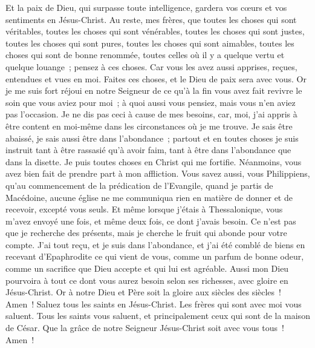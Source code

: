 \begin{multicols}{2}
Et la paix de Dieu, qui surpasse toute intelligence, gardera vos cœurs et vos sentiments en Jésus-Christ.
 Au reste, mes frères, que toutes les choses qui sont véritables, toutes les choses qui sont vénérables, toutes les choses qui sont justes, toutes les choses qui sont pures, toutes les choses qui sont aimables, toutes les choses qui sont de bonne renommée, toutes celles où il y a quelque vertu et quelque louange~; pensez à ces choses.
Car vous les avez aussi apprises, reçues, entendues et vues en moi. Faites ces choses, et le Dieu de paix sera avec vous. 
Or je me suis fort réjoui en notre Seigneur de ce qu'à la fin vous avez fait revivre le soin que vous aviez pour moi~; à quoi aussi vous pensiez, mais vous n'en aviez pas l'occasion. 
Je ne dis pas ceci à cause de mes besoins, car, moi, j'ai appris à être content en moi-même dans les circonstances où je me trouve.
Je sais être abaissé, je sais aussi être dans l'abondance~; partout et en toutes choses je suis instruit tant à être rassasié qu'à avoir faim, tant à être dans l'abondance que dans la disette.
Je puis toutes choses en Christ qui me fortifie.
Néanmoins, vous avez bien fait de prendre part à mon affliction.
Vous savez aussi, vous Philippiens, qu'au commencement de la prédication de l'Evangile, quand je partis de Macédoine, aucune église ne me communiqua rien en matière de donner et de recevoir, excepté vous seuls. 
Et même lorsque j'étais à Thessalonique, vous m'avez envoyé une fois, et même deux fois, ce dont j'avais besoin. 
Ce n'est pas que je recherche des présents, mais je cherche le fruit qui abonde pour votre compte.
J'ai tout reçu, et je suis dans l'abondance, et j'ai été comblé de biens en recevant d'Epaphrodite ce qui vient de vous, comme un parfum de bonne odeur, comme un sacrifice que Dieu accepte et qui lui est agréable.
Aussi mon Dieu pourvoira à tout ce dont vous aurez besoin selon ses richesses, avec gloire en Jésus-Christ. 
Or à notre Dieu et Père soit la gloire aux siècles des siècles~! Amen~!
Saluez tous les saints en Jésus-Christ. Les frères qui sont avec moi vous saluent.
Tous les saints vous saluent, et principalement ceux qui sont de la maison de César.
Que la grâce de notre Seigneur Jésus-Christ soit avec vous tous~! Amen~!
\PPE{}
\end{multicols}
